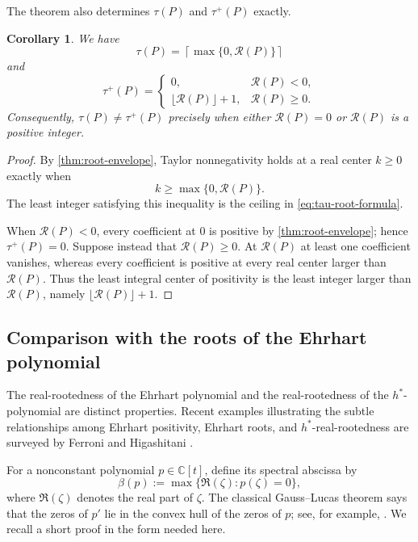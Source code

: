 \documentclass[reqno, 12pt]{article}
\numberwithin{equation}{section}
\newtheorem{corollary}[theorem]{Corollary}
\theoremstyle{definition}
\begin{document}
The theorem also determines $\tau(P)$ and $\tau^+(P)$ exactly.

\begin{corollary}\label{cor:integer-center-root-formula}
We have 
\begin{equation}\label{eq:tau-root-formula}
 \tau(P)=\left\lceil\max\{0,\mathcal R(P)\}\right\rceil
\end{equation}
and
\begin{equation*}
 \tau^+(P)=
 \begin{cases}
  0,&\mathcal R(P)<0,\\[2mm]
  \lfloor \mathcal R(P)\rfloor+1,&\mathcal R(P)\geq0.
 \end{cases}
\end{equation*}
Consequently, $\tau(P)\neq\tau^+(P)$ precisely when either $\mathcal R(P)=0$ or $\mathcal R(P)$ is a positive integer.
\end{corollary}
\begin{proof}
By \cref{thm:root-envelope}, Taylor nonnegativity holds at a real center $k\geq0$ exactly when
\[ k\geq\max\{0,\mathcal R(P)\}.
\]
The least integer satisfying this inequality is the ceiling in \eqref{eq:tau-root-formula}.

When $\mathcal R(P)<0$, every coefficient at $0$ is positive by \cref{thm:root-envelope}; hence $\tau^+(P)=0$.  Suppose instead that $\mathcal R(P)\geq0$.  At $\mathcal R(P)$ at least one coefficient vanishes, whereas every
coefficient is positive at every real center larger than $\mathcal R(P)$. Thus the least integral center of positivity is the least integer larger than $\mathcal R(P)$, namely $\lfloor \mathcal R(P)\rfloor+1$.
\end{proof}

\subsection{Comparison with the roots of the Ehrhart polynomial}

The real-rootedness of the Ehrhart polynomial and the real-rootedness of the $h^*$-polynomial are distinct properties.  Recent examples illustrating the subtle relationships among Ehrhart positivity, Ehrhart roots, and $h^*$-real-rootedness are surveyed by Ferroni and Higashitani \cite{FerroniHigashitani2024}.


For a nonconstant polynomial $p\in\mathbb C[t]$, define its spectral abscissa by
\[\beta(p):=\max\{\Re(\zeta):p(\zeta)=0\},
\]
where $\Re(\zeta)$ denotes the real part of $\zeta$. The classical Gauss--Lucas theorem says that the zeros of $p'$ lie in the
convex hull of the zeros of $p$; see, for example, \cite{RahmanSchmeisser2002}.  We recall a short proof in the form needed here.
\end{document}

